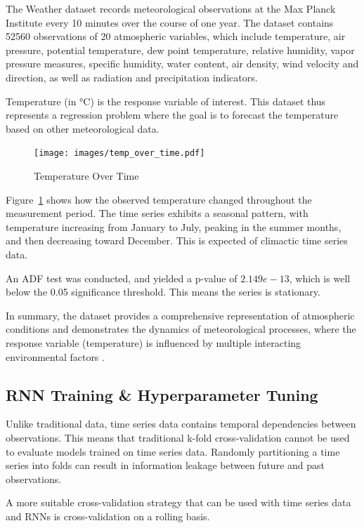 \documentclass[conference]{IEEEtran}
\begin{document}
The Weather dataset records meteorological observations at the Max Planck Institute every 10 minutes over the course of one year. The dataset contains 52560 observations of 20 atmospheric variables, which include temperature, air pressure, potential temperature, dew point temperature, relative humidity, vapor pressure measures, specific humidity, water content, air density, wind velocity and direction, as well as radiation and precipitation indicators. 

Temperature (in \si{\celsius}) is the response variable of interest. This dataset thus represents a regression problem where the goal is to forecast the temperature based on other meteorological data.

\begin{figure}[H]
    \centering
    \texttt{[image: images/temp\_over\_time.pdf]}
    \caption{Temperature Over Time}
    \label{fig:temp_over_time}
\end{figure}

Figure~\ref{fig:temp_over_time} shows how the observed temperature changed throughout the measurement period. The time series exhibits a seasonal pattern, with temperature increasing from January to July, peaking in the summer months, and then decreasing toward December. This is expected of climactic time series data.

An ADF test was conducted, and yielded a p-value of $2.149e-13$, which is well below the 0.05 significance threshold. This means the series is stationary.

In summary, the dataset provides a comprehensive representation of atmospheric conditions and demonstrates the dynamics of meteorological processes, where the response variable (temperature) is influenced by multiple interacting environmental factors \cite{weather_dataset}.

\subsection{\textbf{RNN Training \& Hyperparameter Tuning}}

Unlike traditional data, time series data contains temporal dependencies between observations. This means that traditional k-fold cross-validation cannot be used to evaluate models trained on time series data. Randomly partitioning a time series into folds can result in information leakage between future and past observations.

A more suitable cross-validation strategy that can be used with time series data and RNNs is cross-validation on a rolling basis.
\end{document}
